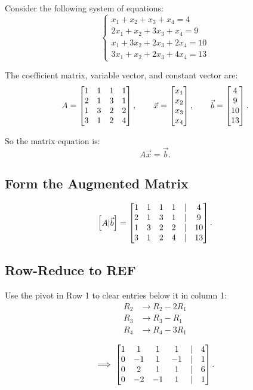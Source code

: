 Consider the following system of equations:
\[
\begin{cases}
x_1 + x_2 + x_3 + x_4 = 4 \\
2x_1 + x_2 + 3x_3 + x_4 = 9 \\
x_1 + 3x_2 + 2x_3 + 2x_4 = 10 \\
3x_1 + x_2 + 2x_3 + 4x_4 = 13
\end{cases}
\]

The coefficient matrix, variable vector, and constant vector are:
\[
A=\begin{bmatrix} 
1 & 1 & 1 & 1\\
2 & 1 & 3 & 1\\
1 & 3 & 2 & 2\\
3 & 1 & 2 & 4
 \end{bmatrix},
\qquad
\vec{x}=\begin{bmatrix} x_1\\x_2\\x_3\\x_4 \end{bmatrix},
\qquad
\vec{b}=\begin{bmatrix} 4\\9\\10\\13 \end{bmatrix}.
\]

So the matrix equation is:
\[
A\vec{x}=\vec{b}.
\]

\subsection{Form the Augmented Matrix}

\[
\begin{bmatrix} A\vert \vec{b} \end{bmatrix}
=
\begin{bmatrix} 
1 & 1 & 1 & 1 & \vert & 4\\
2 & 1 & 3 & 1 & \vert & 9\\
1 & 3 & 2 & 2 & \vert & 10\\
3 & 1 & 2 & 4 & \vert & 13
 \end{bmatrix}.
\]

\subsection{Row-Reduce to REF}

Use the pivot in Row 1 to clear entries below it in column 1:
\begin{align*}
R_2 &\rightarrow R_2 - 2R_1 \\
R_3 &\rightarrow R_3 - R_1 \\
R_4 &\rightarrow R_4 - 3R_1
\end{align*}

\begin{align*}
\implies
\begin{bmatrix} 
1 & 1 & 1 & 1 & \vert & 4\\
0 & -1 & 1 & -1 & \vert & 1\\
0 & 2 & 1 & 1 & \vert & 6\\
0 & -2 & -1 & 1 & \vert & 1
 \end{bmatrix}.
\end{align*}


